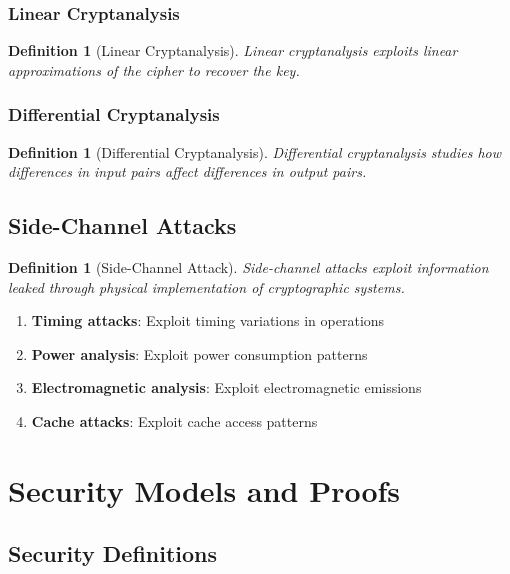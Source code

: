 \documentclass[11pt,a4paper]{article}
\newtheorem{definition}[theorem]{Definition}
\begin{document}
\subsubsection{Linear Cryptanalysis}

\begin{definition}[Linear Cryptanalysis]
Linear cryptanalysis exploits linear approximations of the cipher to recover the key.
\end{definition}

\subsubsection{Differential Cryptanalysis}

\begin{definition}[Differential Cryptanalysis]
Differential cryptanalysis studies how differences in input pairs affect differences in output pairs.
\end{definition}

\subsection{Side-Channel Attacks}

\begin{definition}[Side-Channel Attack]
Side-channel attacks exploit information leaked through physical implementation of cryptographic systems.
\end{definition}

\begin{enumerate}
\item \textbf{Timing attacks}: Exploit timing variations in operations
\item \textbf{Power analysis}: Exploit power consumption patterns
\item \textbf{Electromagnetic analysis}: Exploit electromagnetic emissions
\item \textbf{Cache attacks}: Exploit cache access patterns
\end{enumerate}

\section{Security Models and Proofs}

\subsection{Security Definitions}
\end{document}
